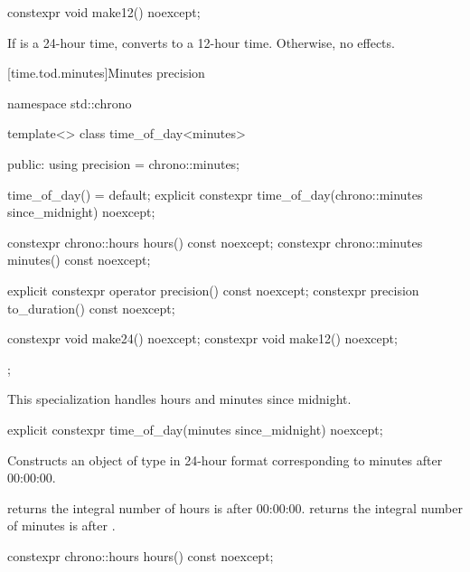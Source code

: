 %
\begin{itemdecl}
constexpr void make12() noexcept;
\end{itemdecl}

\begin{itemdescr}
\pnum
\effects
If  is a 24-hour time,
converts to a 12-hour time.
Otherwise, no effects.
\end{itemdescr}

[time.tod.minutes]{Minutes precision}

\begin{codeblock}
namespace std::chrono {
  template<>
  class time_of_day<minutes> {
  public:
    using precision = chrono::minutes;

    time_of_day() = default;
    explicit constexpr time_of_day(chrono::minutes since_midnight) noexcept;

    constexpr chrono::hours    hours()   const noexcept;
    constexpr chrono::minutes  minutes() const noexcept;

    explicit constexpr operator precision()    const noexcept;
    constexpr          precision to_duration() const noexcept;

    constexpr void make24() noexcept;
    constexpr void make12() noexcept;
  };
}
\end{codeblock}

\pnum
\begin{note}
This specialization handles hours and minutes since midnight.
\end{note}

%
\begin{itemdecl}
explicit constexpr time_of_day(minutes since_midnight) noexcept;
\end{itemdecl}

\begin{itemdescr}
\pnum
\effects
Constructs an object of type 
in 24-hour format
corresponding to  minutes after 00:00:00.

\pnum
\postconditions
{} returns the integral number of hours
 is after 00:00:00.
 returns the integral number of minutes
 is after .
\end{itemdescr}

%
\begin{itemdecl}
constexpr chrono::hours hours() const noexcept;
\end{itemdecl}

